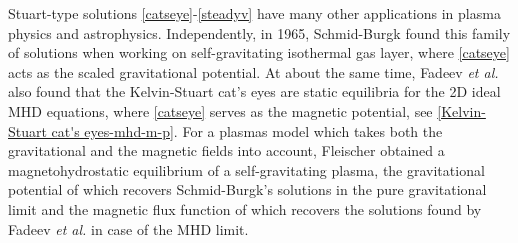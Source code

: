 \documentclass[1 [leqno, 11pt]{amsart}
\numberwithin{equation}{section}
\begin{document}
\begin{CJK*}{GBK}{song}
Stuart-type solutions \eqref{catseye}-\eqref{steadyv} have many other applications in plasma physics and astrophysics.
  Independently, in 1965, Schmid-Burgk \cite{Schmid-Burgk1965}  found this family of solutions   when  working on self-gravitating isothermal gas layer, where \eqref{catseye}  acts  as the scaled  gravitational potential.
  At about the same time,
 Fadeev  {\it et al.} \cite{Fadeev et al-1965} also found that the Kelvin-Stuart cat's eyes are  static equilibria  for the 2D ideal MHD equations, where \eqref{catseye} serves as the  magnetic potential, see \eqref{Kelvin-Stuart cat's eyes-mhd-m-p}.
For a plasmas model which takes both the gravitational and the
magnetic fields into account,
  Fleischer \cite{Fleischer1998} obtained a magnetohydrostatic equilibrium of
a self-gravitating plasma, the gravitational potential of which recovers Schmid-Burgk's solutions in the pure gravitational limit and the magnetic flux function of which recovers the solutions found by Fadeev  {\it et al.} 
in
case of the MHD limit.



\end{CJK*}
\end{document}
